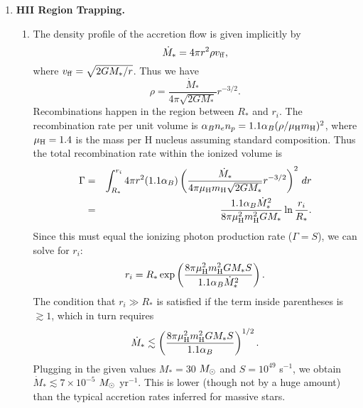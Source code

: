 \solutionset

\begin{enumerate}

\item \textbf{HII Region Trapping.}

\begin{enumerate}

\item The density profile of the accretion flow is given implicitly by
\begin{displaymath}
\dot{M}_* = 4\pi r^2 \rho v_{\rm ff},
\end{displaymath}
where $v_{\rm ff} = \sqrt{2 G M_*/r}$. Thus we have
\begin{displaymath}
\rho = \frac{\dot{M}_*}{4\pi \sqrt{2G M_*}} r^{-3/2}.
\end{displaymath}
Recombinations happen in the region between $R_*$ and $r_i$. The recombination rate per unit volume is $\alpha_B n_e n_p = 1.1 \alpha_B (\rho/\mu_{\rm H} m_{\rm H})^2$, where $\mu_{\rm H} =1.4$ is the mass per H nucleus assuming standard composition. Thus the total recombination rate within the ionized volume is
\begin{eqnarray*}
\Gamma & = & \int_{R_*}^{r_i} 4\pi r^2 (1.1\alpha_B) \left(\frac{\dot{M}_*}{4\pi \mu_{\rm H} m_{\rm H} \sqrt{2G M_*}} r^{-3/2}\right)^2 \, dr \\
& = & \frac{1.1\alpha_B \dot{M}_*^2}{8\pi \mu_{\rm H}^2 m_{\rm H}^2 G M_*} \ln \frac{r_i}{R_*}.
\end{eqnarray*}
Since this must equal the ionizing photon production rate ($\Gamma = S$), we can solve for $r_i$:
\begin{displaymath}
r_i = R_* \exp\left(\frac{8\pi \mu_{\rm H}^2 m_{\rm H}^2 G M_* S}{1.1 \alpha_B \dot{M}_*^2}\right).
\end{displaymath}
The condition that $r_i \gg R_*$ is satisfied if the term inside parentheses is $\gtrsim 1$, which in turn requires
\begin{displaymath}
\dot{M}_* \lesssim \left(\frac{8\pi \mu_{\rm H}^2 m_{\rm H}^2 G M_* S}{1.1 \alpha_B}\right)^{1/2}.
\end{displaymath}
Plugging in the given values $M_* = 30$ $M_{\odot}$ and $S=10^{49}$ s$^{-1}$, we obtain $\dot{M}_* \lesssim 7\times 10^{-5}$ $M_{\odot}$ yr$^{-1}$. This is lower (though not by a huge amount) than the typical accretion rates inferred for massive stars.


\end{enumerate}
\end{enumerate}
